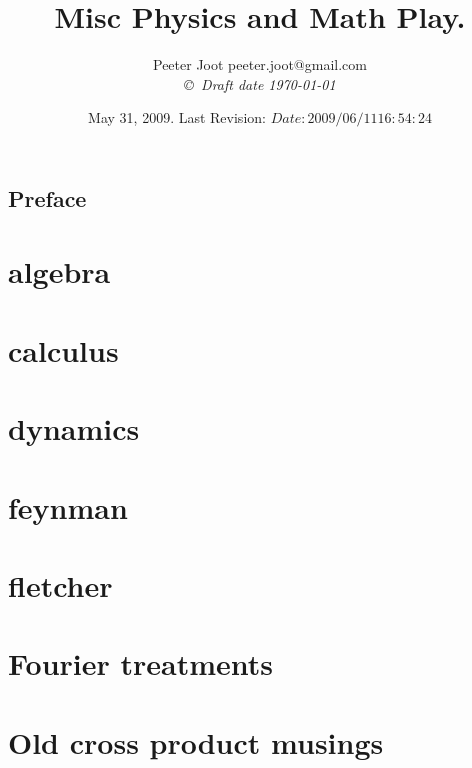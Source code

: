 \documentclass[12pt,leqno]{book}
\title{Misc Physics and Math Play.}
\author{Peeter Joot  \quad peeter.joot@gmail.com \\
{\small\em \copyright \  Draft date \today }}
\date{ May 31, 2009.  Last Revision: $Date: 2009/06/11 16:54:24 $ }
\begin{document}
\maketitle
\tableofcontents
\listoffigures
\listoftables
\chapter*{Preface}\normalsize
\pagestyle{plain}

%
\pagestyle{headings}


\part{algebra}





\part{calculus}





\part{dynamics}


\part{feynman}


\part{fletcher}


\part{Fourier treatments}


\part{Old cross product musings}


\end{document}
